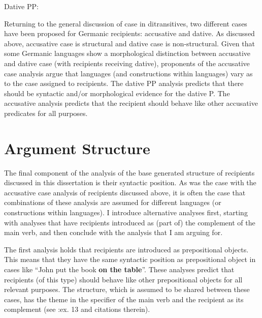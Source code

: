 \begin{exe}
\ex Dative PP: \\
\end{exe}

Returning to the general discussion of case in ditransitives, two different cases have been proposed for Germanic recipients: accusative and dative. As discussed above, accusative case is structural and dative case is non-structural. Given that some Germanic languages show a morphological distinction between accusative and dative case (with recipients receiving dative), proponents of the accusative case analysis argue that languages (and constructions within languages) vary as to the case assigned to recipients. The dative PP analysis predicts that there should be syntactic and/or morphological evidence for the dative P. The accusative analysis predicts that the recipient should behave like other accusative predicates for all purposes.

\section{Argument Structure}
The final component of the analysis of the base generated structure of recipients discussed in this dissertation is their syntactic position. As was the case with the accusative case analysis of recipients discussed above, it is often the case that combinations of these analysis are assumed for different languages (or constructions within languages). I introduce alternative analyses first, starting with analyses that have recipients introduced as (part of) the complement of the main verb, and then conclude with the analysis that I am arguing for.

The first analysis holds that recipients are introduced as prepositional objects. This means that they have the same syntactic position as prepositional object in cases like ``John put the book \textbf{on the table}''. These analyses predict that recipients (of this type) should behave like other prepositional objects for all relevant purposes. The structure, which is assumed to be shared between these cases, has the theme in the specifier of the main verb and the recipient as its complement (see \citealt{Larson.1988}:ex. 13 and citations therein).


